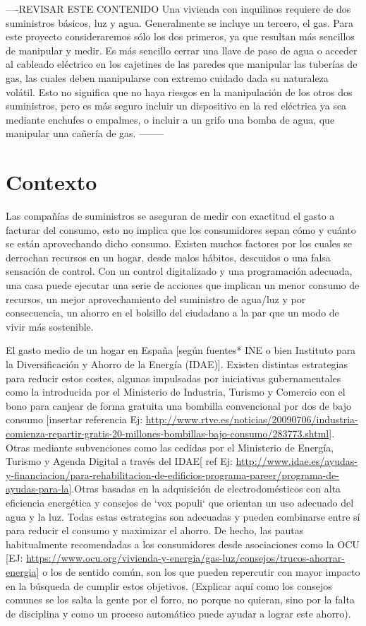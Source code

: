 ----REVISAR ESTE CONTENIDO
Una vivienda con inquilinos requiere de dos suministros básicos, luz y agua. Generalmente se incluye un tercero, el gas. Para este proyecto consideraremos sólo los dos primeros, ya que resultan más sencillos de manipular y medir. Es más sencillo cerrar una llave de paso de agua o acceder al cableado eléctrico en los cajetines de las paredes que manipular las tuberías de gas, las cuales deben manipularse con extremo cuidado dada su naturaleza volátil. Esto no significa que no haya riesgos en la manipulación de los otros dos suministros, pero es más seguro incluir un dispositivo en la red eléctrica ya sea mediante enchufes o empalmes, o incluir a un grifo una bomba de agua, que manipular una cañería de gas.
--------


\section{Contexto}
\label{ch:Capitulo1.2}

Las compañías de suministros se aseguran de medir con exactitud el gasto a facturar del consumo, esto no implica que los consumidores sepan cómo y cuánto se están aprovechando dicho consumo. Existen muchos factores por los cuales se derrochan recursos en un hogar, desde malos hábitos, descuidos o una falsa sensación de control. Con un control digitalizado y una programación adecuada, una casa puede ejecutar una serie de acciones que implican un menor consumo de recursos, un mejor aprovechamiento del suministro de agua/luz y por consecuencia, un ahorro en el bolsillo del ciudadano a la par que un modo de vivir más sostenible.

El gasto medio de un hogar en España [según fuentes* INE o bien Instituto para la Diversificación y Ahorro de la Energía (IDAE)]. Existen distintas estrategias para reducir estos costes, algunas impulsadas por iniciativas gubernamentales como la introducida por el Ministerio de Industria, Turismo y Comercio con el bono para canjear de forma gratuita una bombilla convencional por dos de bajo consumo [insertar referencia Ej: \url{http://www.rtve.es/noticias/20090706/industria-comienza-repartir-gratis-20-millones-bombillas-bajo-consumo/283773.shtml}]. Otras mediante subvenciones como las cedidas por el Ministerio de Energía, Turismo y Agenda Digital a través del IDAE[ ref Ej: \url{http://www.idae.es/ayudas-y-financiacion/para-rehabilitacion-de-edificios-programa-pareer/programa-de-ayudas-para-la}].Otras basadas en la adquisición de electrodomésticos con alta eficiencia energética y consejos de `vox populi` que orientan un uso adecuado del agua y la luz. Todas estas estrategias son adecuadas y pueden combinarse entre sí para reducir el consumo y maximizar el ahorro. De hecho, las pautas habitualmente recomendadas a los consumidores desde asociaciones como la OCU [EJ: \url{https://www.ocu.org/vivienda-y-energia/gas-luz/consejos/trucos-ahorrar-energia}] o los de sentido común, son los que pueden repercutir con mayor impacto en la búsqueda de cumplir estos objetivos. (Explicar aquí como los consejos comunes se los salta la gente por el forro, no porque no quieran, sino por la falta de disciplina y como un proceso automático puede ayudar a lograr este ahorro).

